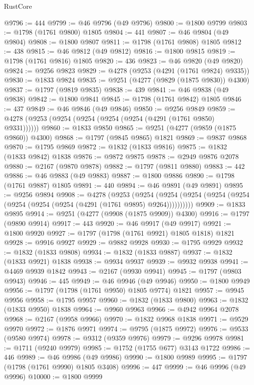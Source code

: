 \begin{lexlean}{RustCore}
\begin{coremodule}
@9796 := 444
@9799 := @46 @9796 (@49 @9796)
@9800 := @1800 @9799
@9803 := @1798 (@1761 @9800) @1805
@9804 := 441
@9807 := @46 @9804 (@49 @9804)
@9808 := @1800 @9807
@9811 := @1798 (@1761 @9808) @1805
@9812 := 438
@9815 := @46 @9812 (@49 @9812)
@9816 := @1800 @9815
@9819 := @1798 (@1761 @9816) @1805
@9820 := 436
@9823 := @46 @9820 (@49 @9820)
@9824 := @9256 @9823
@9829 := @4278 (@9253 (@4291 (@1761 @9824) @9335))
@9830 := @1833 @9824
@9835 := @9251 (@4277 (@9829 (@1875 @9830)) @4300)
@9837 := @1797 (@9819 @9835)
@9838 := 439
@9841 := @46 @9838 (@49 @9838)
@9842 := @1800 @9841
@9845 := @1798 (@1761 @9842) @1805
@9846 := 437
@9849 := @46 @9846 (@49 @9846)
@9850 := @9256 @9849
@9859 := @4278 (@9253 (@9254 (@9254 (@9254 (@9254 (@4291 (@1761 @9850) @9331))))))
@9860 := @1833 @9850
@9865 := @9251 (@4277 (@9859 (@1875 @9860)) @4300)
@9868 := @1797 (@9845 @9865) @1821
@9869 := @9837 @9868
@9870 := @1795 @9869
@9872 := @1832 (@1833 @9816)
@9875 := @1832 (@1833 @9842) @1838
@9876 := @9872 @9875
@9878 := @2949 @9876 @2078
@9880 := @2167 (@9870 @9878)
@9882 := @1797 (@9811 @9880)
@9883 := 442
@9886 := @46 @9883 (@49 @9883)
@9887 := @1800 @9886
@9890 := @1798 (@1761 @9887) @1805
@9891 := 440
@9894 := @46 @9891 (@49 @9891)
@9895 := @9256 @9894
@9908 := @4278
    (@9253
      (@9254 (@9254 (@9254 (@9254 (@9254 (@9254 (@9254 (@9254 (@4291 (@1761 @9895) @9264))))))))))
@9909 := @1833 @9895
@9914 := @9251 (@4277 (@9908 (@1875 @9909)) @4300)
@9916 := @1797 (@9890 @9914)
@9917 := 443
@9920 := @46 @9917 (@49 @9917)
@9921 := @1800 @9920
@9927 := @1797 (@1798 (@1761 @9921) @1805 @1818) @1821
@9928 := @9916 @9927
@9929 := @9882 @9928
@9930 := @1795 @9929
@9932 := @1832 (@1833 @9808)
@9934 := @1832 (@1833 @9887)
@9937 := @1832 (@1833 @9921) @1838
@9938 := @9934 @9937
@9939 := @9932 @9938
@9941 := @4469 @9939 @1842
@9943 := @2167 (@9930 @9941)
@9945 := @1797 (@9803 @9943)
@9946 := 445
@9949 := @46 @9946 (@49 @9946)
@9950 := @1800 @9949
@9956 := @1797 (@1798 (@1761 @9950) @1805 @9774) @1821
@9957 := @9945 @9956
@9958 := @1795 @9957
@9960 := @1832 (@1833 @9800)
@9963 := @1832 (@1833 @9950) @1838
@9964 := @9960 @9963
@9966 := @4942 @9964 @2078
@9968 := @2167 (@9958 @9966)
@9970 := @1832 @9968 @1838
@9971 := @9529 @9970
@9972 := @1876 @9971
@9974 := @9795 (@1875 @9972)
@9976 := @9533 (@9580 @9974)
@9978 := @9312 (@9359 @9976)
@9979 := @9296 @9978
@9981 := @1711 (@9240 @9979)
@9985 := @1752 (@1755 @677) @3143 @1722
@9986 := 446
@9989 := @46 @9986 (@49 @9986)
@9990 := @1800 @9989
@9995 := @1797 (@1798 (@1761 @9990) @1805 @3408)
@9996 := 447
@9999 := @46 @9996 (@49 @9996)
@10000 := @1800 @9999

\end{coremodule}
\end{lexlean}
